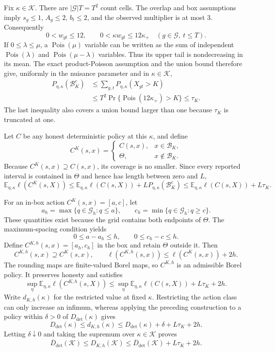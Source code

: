 Fix \(\kappa\in\mathcal K\).  There are \(|\mathcal G|T=T^2\) count cells.  The overlap and box assumptions imply \(s_g\le 1\), \(A_g\le2\), \(b_t\le2\), and the observed multiplier is at most \(3\).  Consequently
\[
  0<w_{gt}\le 12,
  \qquad
  0<\kappa w_{gt}\le12\kappa_+
  \quad(g\in\mathcal G,\ t\le T).
\]
If \(0\le\lambda\le\mu\), a \(\operatorname{Pois}(\mu)\) variable can be written as the sum of independent \(\operatorname{Pois}(\lambda)\) and \(\operatorname{Pois}(\mu-\lambda)\) variables.  Thus its upper tail is nondecreasing in its mean.  The exact product-Poisson assumption and the union bound therefore give, uniformly in the nuisance parameter and in \(\kappa\in\mathcal K\),
\[
 \begin{split}
 P_{\eta,\kappa}(\mathcal B_K^c)
 &\le \sum_{g,t}P_{\eta,\kappa}(X_{gt}>K)\\
 &\le T^2\Pr\{\operatorname{Pois}(12\kappa_+)>K\}
 \le \tau_K .
 \end{split}
\]
The last inequality also covers a union bound larger than one because \(\tau_K\) is truncated at one.

Let \(C\) be any honest deterministic policy at this \(\kappa\), and define
\[
 C^K(s,x)=
 \begin{cases}
 C(s,x),&x\in\mathcal B_K,\\
 \Theta,&x\notin\mathcal B_K.
 \end{cases}
\]
Because \(C^K(s,x)\supseteq C(s,x)\), its coverage is no smaller.  Since every reported interval is contained in \(\Theta\) and hence has length between zero and \(L\),
\[
 \mathbb E_{\eta,\kappa}\ell(C^K(s,X))
 \le
 \mathbb E_{\eta,\kappa}\ell(C(s,X))
   +L P_{\eta,\kappa}(\mathcal B_K^c)
 \le
 \mathbb E_{\eta,\kappa}\ell(C(s,X))+L\tau_K .
\]

For an in-box action \(C^K(s,x)=[a,c]\), let
\[
 a_h=\max\{q\in\mathcal G_h:q\le a\},
 \qquad
 c_h=\min\{q\in\mathcal G_h:q\ge c\}.
\]
These quantities exist because the grid contains both endpoints of \(\Theta\).  The maximum-spacing condition yields
\[
 0\le a-a_h\le h,
 \qquad
 0\le c_h-c\le h.
\]
Define \(C^{K,h}(s,x)=[a_h,c_h]\) in the box and retain \(\Theta\) outside it.  Then
\[
 C^{K,h}(s,x)\supseteq C^K(s,x),
 \qquad
 \ell(C^{K,h}(s,x))\le\ell(C^K(s,x))+2h.
\]
The rounding maps are finite-valued Borel maps, so \(C^{K,h}\) is an admissible Borel policy.  It preserves honesty and satisfies
\[
 \sup_\eta\mathbb E_{\eta,\kappa}\ell(C^{K,h}(s,X))
 \le
 \sup_\eta\mathbb E_{\eta,\kappa}\ell(C(s,X))+L\tau_K+2h.
\]
Write \(d_{K,h}(\kappa)\) for the restricted value at fixed \(\kappa\).  Restricting the action class can only increase an infimum, whereas applying the preceding construction to a policy within \(\delta>0\) of \(D_{\mathrm{det}}(\kappa)\) gives
\[
 D_{\mathrm{det}}(\kappa)
 \le d_{K,h}(\kappa)
 \le D_{\mathrm{det}}(\kappa)+\delta+L\tau_K+2h.
\]
Letting \(\delta\downarrow0\) and taking the supremum over \(\kappa\in\mathcal K\) proves
\[
 \overline D_{\mathrm{det}}(\mathcal K)
 \le D_{K,h}(\mathcal K)
 \le \overline D_{\mathrm{det}}(\mathcal K)+L\tau_K+2h.
\]

